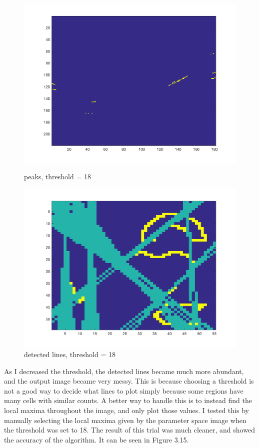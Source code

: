 \documentclass[paper=a4, fontsize=11pt]{scrartcl} %
\numberwithin{equation}{section} %
\numberwithin{figure}{section} %
\numberwithin{table}{section} %
\begin{document}
\begin{figure}[H]
  \centering
  \begin{minipage}[b]{0.49\textwidth}
    \includegraphics[width=\textwidth]{peaks_threshold_18.png}
    \caption{peaks, threshold = 18}
  \end{minipage}
  \hfill
  \begin{minipage}[b]{0.49\textwidth}
    \includegraphics[width=\textwidth]{edgeDetection_threshold_18.png}
    \caption{detected lines, threshold = 18}
  \end{minipage}
\end{figure}

As I decreased the threshold, the detected lines became much more abundant, and the output image became very messy. This is because choosing a threshold is not a good way to decide what lines to plot simply because some regions have many cells with similar counts. A better way to handle this is to instead find the local maxima throughout the image, and only plot those values. I tested this by manually selecting the local maxima given by the parameter space image when the threshold was set to 18. The result of this trial was much cleaner, and showed the accuracy of the algorithm. It can be seen in Figure 3.15.
\end{document}
